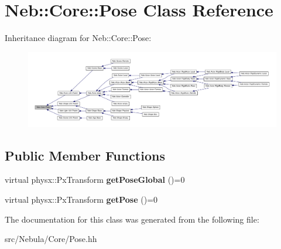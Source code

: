 \hypertarget{classNeb_1_1Core_1_1Pose}{\section{\-Neb\-:\-:\-Core\-:\-:\-Pose \-Class \-Reference}
\label{classNeb_1_1Core_1_1Pose}
}


\-Inheritance diagram for \-Neb\-:\-:\-Core\-:\-:\-Pose\-:\nopagebreak
\begin{figure}[H]
\begin{center}
\leavevmode
\includegraphics[width=350pt]{classNeb_1_1Core_1_1Pose__inherit__graph}
\end{center}
\end{figure}
\subsection*{\-Public \-Member \-Functions}
\begin{DoxyCompactItemize}
\item 
\hypertarget{classNeb_1_1Core_1_1Pose_a68344a73874b28cfc25608c802c030ca}{virtual physx\-::\-Px\-Transform {\bfseries get\-Pose\-Global} ()=0}\label{classNeb_1_1Core_1_1Pose_a68344a73874b28cfc25608c802c030ca}

\item 
\hypertarget{classNeb_1_1Core_1_1Pose_a85727b01252cd84bfe2d99fedbacd29f}{virtual physx\-::\-Px\-Transform {\bfseries get\-Pose} ()=0}\label{classNeb_1_1Core_1_1Pose_a85727b01252cd84bfe2d99fedbacd29f}

\end{DoxyCompactItemize}


\-The documentation for this class was generated from the following file\-:\begin{DoxyCompactItemize}
\item 
src/\-Nebula/\-Core/\-Pose.\-hh\end{DoxyCompactItemize}
